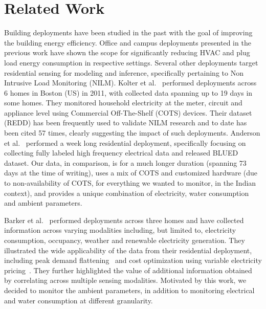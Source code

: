 \documentclass[10pt]{sensys-proc}
\begin{document}
\vspace{-1mm}
\section{Related Work}
 Building deployments have been studied in the past with the goal of improving the building energy efficiency. Office and campus deployments presented in the previous work \cite{yuvraj_ipsn,batra} have shown the scope for significantly reducing HVAC and plug load energy consumption in respective settings. Several other deployments target residential sensing for modeling and inference, specifically pertaining to Non Intrusive Load Monitoring (NILM). Kolter et al.~\cite{redd} performed deployments across 6 homes in Boston (US) in 2011, with collected data spanning up to 19 days in some homes. They monitored household electricity at the meter, circuit and appliance level using Commercial Off-The-Shelf (COTS) devices. Their dataset (REDD) has been frequently used to validate NILM research and to date has been cited 57 times, clearly suggesting the impact of such deployments. Anderson et al.~\cite{blued_cmu} performed a week long residential deployment, specifically focusing on collecting fully labeled high frequency electrical data and released BLUED dataset. Our data, in comparison, is for a much longer duration (spanning 73 days at the time of writing), uses a mix of COTS and customized hardware (due to non-availability of COTS, for everything we wanted to monitor, in the Indian context), and provides a unique combination of electricity, water consumption and ambient parameters.

 Barker et al.~\cite{smart} performed deployments across three homes and have collected information across varying modalities including, but limited to, electricity consumption, occupancy, weather and renewable electricity generation. They illustrated the wide applicability of the data from their residential deployment, including peak demand flattening~\cite{smartcap} and cost optimization using variable electricity pricing~\cite{smartcharge}. They further highlighted the value of additional information obtained by correlating across multiple sensing modalities. Motivated by this work, we decided to monitor the ambient parameters, in addition to monitoring electrical and water consumption at different granularity. %
\end{document}
